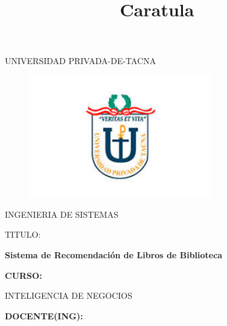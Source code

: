 \documentclass[12pt,letterpaper]{article}
\begin{document}
%


\title{Caratula}

\begin{titlepage}
\begin{center}
\large{UNIVERSIDAD PRIVADA-DE-TACNA}\\
\vspace*{-0.025in}
\begin{figure}[htb]
\begin{center}
\includegraphics[width=8cm]{./Imagenes/logo}
\end{center}
\end{figure}
\vspace*{0.15in}
INGENIERIA DE SISTEMAS  \\
\vspace*{0.5in}
\begin{large}
TITULO:\\
\end{large}
\vspace*{0.1in}
\begin{Large}
\textbf{Sistema de Recomendación de Libros de Biblioteca} \\
\end{Large}
\vspace*{0.3in}
\begin{Large}
\textbf{CURSO:} \\
\end{Large}
\vspace*{0.1in}
\begin{large}
INTELIGENCIA DE NEGOCIOS\\
\end{large}
\vspace*{0.3in}
\begin{Large}
\textbf{DOCENTE(ING):} \\
\end{Large}

\end{center}
\end{titlepage}
\end{document}
